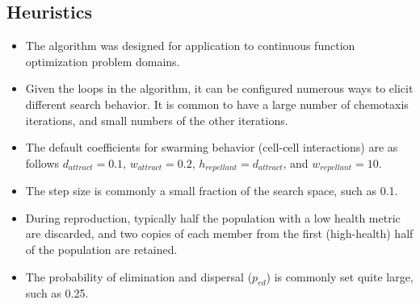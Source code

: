 \subsection{Heuristics}
\begin{itemize}
	\item The algorithm was designed for application to continuous function optimization problem domains.
	\item Given the loops in the algorithm, it can be configured numerous ways to elicit different search behavior. It is common to have a large number of chemotaxis iterations, and small numbers of the other iterations.
	\item The default coefficients for swarming behavior (cell-cell interactions) are as follows $d_{attract}=0.1$, $w_{attract}=0.2$, $h_{repellant}=d_{attract}$, and $w_{repellant}=10$.	
	\item The step size is commonly a small fraction of the search space, such as 0.1.
	\item During reproduction, typically half the population with a low health metric are discarded, and two copies of each member from the first (high-health) half of the population are retained.
	\item The probability of elimination and dispersal ($p_{ed}$) is commonly set quite large, such as 0.25.
\end{itemize}

